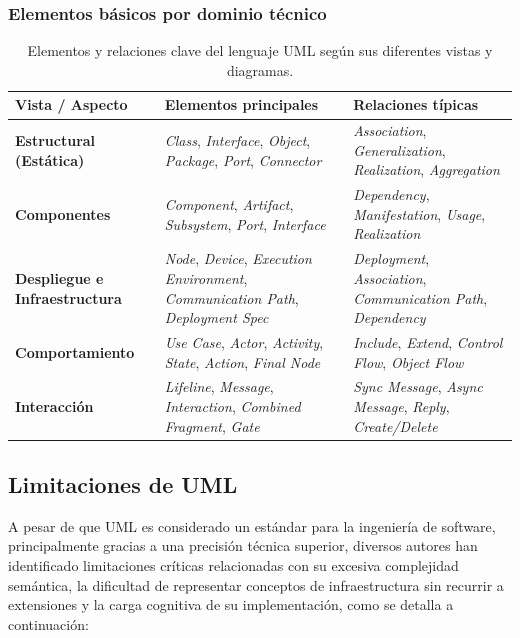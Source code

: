 	\subsubsection{Elementos básicos por dominio técnico}
	
	\begin{table}[H]
	\centering
	\renewcommand{\arraystretch}{1.3}
	\setlength{\tabcolsep}{8pt}
	\begin{tabular}{@{}p{4cm}p{6cm}p{6cm}@{}}
	\toprule
	\textbf{Vista / Aspecto} & \textbf{Elementos principales} & \textbf{Relaciones típicas} \\ 
	\midrule
	\textbf{Estructural (Estática)} &
	\textit{Class}, \textit{Interface}, \textit{Object}, \textit{Package}, \textit{Port}, \textit{Connector} &
	\textit{Association}, \textit{Generalization}, \textit{Realization}, \textit{Aggregation} \\ 
	\midrule
	\textbf{Componentes} &
	\textit{Component}, \textit{Artifact}, \textit{Subsystem}, \textit{Port}, \textit{Interface} &
	\textit{Dependency}, \textit{Manifestation}, \textit{Usage}, \textit{Realization} \\ 
	\midrule
	\textbf{Despliegue e Infraestructura} &
	\textit{Node}, \textit{Device}, \textit{Execution Environment}, \textit{Communication Path}, \textit{Deployment Spec} &
	\textit{Deployment}, \textit{Association}, \textit{Communication Path}, \textit{Dependency} \\ 
	\midrule
	\textbf{Comportamiento} &
	\textit{Use Case}, \textit{Actor}, \textit{Activity}, \textit{State}, \textit{Action}, \textit{Final Node} &
	\textit{Include}, \textit{Extend}, \textit{Control Flow}, \textit{Object Flow} \\ 
	\midrule
	\textbf{Interacción} &
	\textit{Lifeline}, \textit{Message}, \textit{Interaction}, \textit{Combined Fragment}, \textit{Gate} &
	\textit{Sync Message}, \textit{Async Message}, \textit{Reply}, \textit{Create/Delete} \\ 
	\bottomrule
	\end{tabular}
	\caption{Elementos y relaciones clave del lenguaje UML según sus diferentes vistas y diagramas.}
	\label{table:uml-elements}
	\end{table}

\subsection{Limitaciones de UML}

A pesar de que UML es considerado un estándar para la ingeniería de software, principalmente gracias a una precisión técnica superior, diversos autores han identificado limitaciones críticas relacionadas con su excesiva complejidad semántica, la dificultad de representar conceptos de infraestructura sin recurrir a extensiones y la carga cognitiva de su implementación, como se detalla a continuación:

